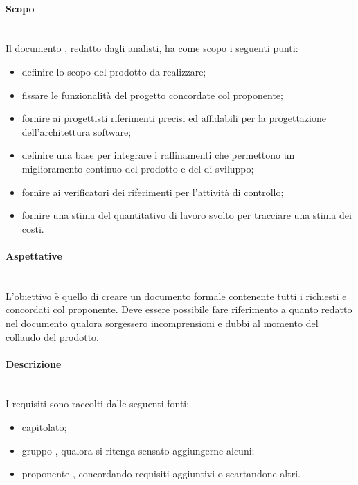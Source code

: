 \paragraph{Scopo}\mbox{}\\
Il documento \AdR{}, redatto dagli analisti, ha come scopo i seguenti punti:
\begin{itemize}
\item definire lo scopo del prodotto da realizzare;
\item fissare le funzionalità del progetto concordate col proponente;
\item fornire ai progettisti riferimenti precisi ed affidabili per la progettazione dell'architettura software;
\item definire una base per integrare i raffinamenti che permettono un miglioramento continuo del prodotto e del  di sviluppo;
\item fornire ai verificatori dei riferimenti per l’attività di controllo;
\item fornire una stima del quantitativo di lavoro svolto per tracciare una stima dei costi. 
\end{itemize}

\paragraph{Aspettative}\mbox{}\\
L'obiettivo è quello di creare un documento formale contenente tutti i  richiesti e concordati col proponente.
Deve essere possibile fare riferimento a quanto redatto nel documento \AdR{} qualora sorgessero incomprensioni e dubbi al momento del collaudo del prodotto.

\paragraph{Descrizione}\mbox{}\\
I requisiti sono raccolti dalle seguenti fonti:
\begin{itemize}
\item capitolato;
\item gruppo \Gruppo{}, qualora si ritenga sensato aggiungerne alcuni;
\item proponente \Proponente{}, concordando requisiti aggiuntivi o scartandone altri.
\end{itemize}

